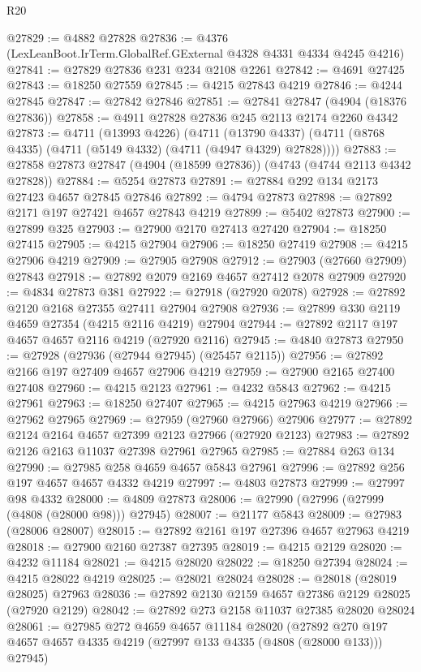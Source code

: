 \begin{lexlean}{R20}
\begin{coremodule}
@27829 := @4882 @27828
@27836 := @4376 (LexLeanBoot.IrTerm.GlobalRef.GExternal @4328 @4331 @4334 @4245 @4216)
@27841 := @27829 @27836 @231 @234 @2108 @2261
@27842 := @4691 @27425
@27843 := @18250 @27559
@27845 := @4215 @27843 @4219
@27846 := @4244 @27845
@27847 := @27842 @27846
@27851 := @27841 @27847 (@4904 (@18376 @27836))
@27858 := @4911 @27828 @27836 @245 @2113 @2174 @2260 @4342
@27873 := @4711
    (@13993 @4226)
    (@4711 (@13790 @4337) (@4711 (@8768 @4335) (@4711 (@5149 @4332) (@4711 (@4947 @4329) @27828))))
@27883 := @27858 @27873 @27847 (@4904 (@18599 @27836)) (@4743 (@4744 @2113 @4342 @27828))
@27884 := @5254 @27873
@27891 := @27884 @292 @134 @2173 @27423 @4657 @27845 @27846
@27892 := @4794 @27873
@27898 := @27892 @2171 @197 @27421 @4657 @27843 @4219
@27899 := @5402 @27873
@27900 := @27899 @325
@27903 := @27900 @2170 @27413 @27420
@27904 := @18250 @27415
@27905 := @4215 @27904
@27906 := @18250 @27419
@27908 := @4215 @27906 @4219
@27909 := @27905 @27908
@27912 := @27903 (@27660 @27909) @27843
@27918 := @27892 @2079 @2169 @4657 @27412 @2078 @27909
@27920 := @4834 @27873 @381
@27922 := @27918 (@27920 @2078)
@27928 := @27892 @2120 @2168 @27355 @27411 @27904 @27908
@27936 := @27899 @330 @2119 @4659 @27354 (@4215 @2116 @4219) @27904
@27944 := @27892 @2117 @197 @4657 @4657 @2116 @4219 (@27920 @2116)
@27945 := @4840 @27873
@27950 := @27928 (@27936 (@27944 @27945) (@25457 @2115))
@27956 := @27892 @2166 @197 @27409 @4657 @27906 @4219
@27959 := @27900 @2165 @27400 @27408
@27960 := @4215 @2123
@27961 := @4232 @5843
@27962 := @4215 @27961
@27963 := @18250 @27407
@27965 := @4215 @27963 @4219
@27966 := @27962 @27965
@27969 := @27959 (@27960 @27966) @27906
@27977 := @27892 @2124 @2164 @4657 @27399 @2123 @27966 (@27920 @2123)
@27983 := @27892 @2126 @2163 @11037 @27398 @27961 @27965
@27985 := @27884 @263 @134
@27990 := @27985 @258 @4659 @4657 @5843 @27961
@27996 := @27892 @256 @197 @4657 @4657 @4332 @4219
@27997 := @4803 @27873
@27999 := @27997 @98 @4332
@28000 := @4809 @27873
@28006 := @27990 (@27996 (@27999 (@4808 (@28000 @98))) @27945)
@28007 := @21177 @5843
@28009 := @27983 (@28006 @28007)
@28015 := @27892 @2161 @197 @27396 @4657 @27963 @4219
@28018 := @27900 @2160 @27387 @27395
@28019 := @4215 @2129
@28020 := @4232 @11184
@28021 := @4215 @28020
@28022 := @18250 @27394
@28024 := @4215 @28022 @4219
@28025 := @28021 @28024
@28028 := @28018 (@28019 @28025) @27963
@28036 := @27892 @2130 @2159 @4657 @27386 @2129 @28025 (@27920 @2129)
@28042 := @27892 @273 @2158 @11037 @27385 @28020 @28024
@28061 := @27985
    @272
    @4659
    @4657
    @11184
    @28020
    (@27892 @270 @197 @4657 @4657 @4335 @4219 (@27997 @133 @4335 (@4808 (@28000 @133))) @27945)

\end{coremodule}
\end{lexlean}
